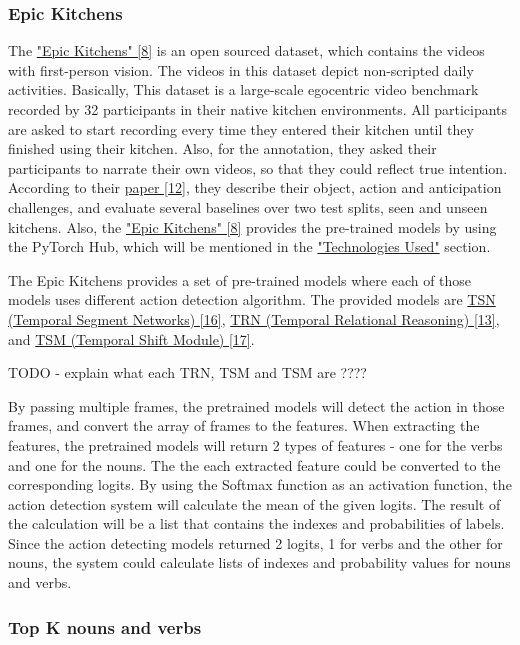\documentclass{article}
\begin{document}
\subsubsection{Epic Kitchens}

The \hyperlink{ref8}{"Epic Kitchens" [8]} is an open sourced dataset, which contains the videos with first-person vision. The videos in this dataset depict non-scripted daily activities. Basically, This dataset is  a large-scale egocentric video benchmark recorded by 32 participants in their native kitchen environments. All participants are asked to start recording every time they entered their kitchen until they finished using their kitchen. Also, for the annotation, they asked their participants to narrate their own videos, so that they could reflect true intention. According to their \hyperlink{ref12}{paper [12]}, they describe their object, action and anticipation challenges, and evaluate several baselines over two test splits, seen and unseen kitchens. Also, the \hyperlink{ref8}{"Epic Kitchens" [8]} provides the pre-trained models by using the PyTorch Hub, which will be mentioned in the \hyperlink{actionDetection_used}{"Technologies Used"} section.

The Epic Kitchens provides a set of pre-trained models where each of those models uses different action detection algorithm. The provided models are \hyperlink{ref16}{TSN (Temporal Segment Networks) [16]}, \hyperlink{ref13}{TRN (Temporal Relational Reasoning) [13]}, and \hyperlink{ref17}{TSM (Temporal Shift Module) [17]}.

TODO - explain what each TRN, TSM and TSM are ????

By passing multiple frames, the pretrained models will detect the action in those frames, and convert the array of frames to the features. When extracting the features, the pretrained models will return 2 types of features - one for the verbs and one for the nouns. The the each extracted feature could be converted to the corresponding logits. By using the Softmax function as an activation function, the action detection system will calculate the mean of the given logits. The result of the calculation will be a list that contains the indexes and probabilities of labels. Since the action detecting models returned 2 logits, 1 for verbs and the other for nouns, the system could calculate lists of indexes and probability values for nouns and verbs.

\subsubsection{Top K nouns and verbs}
\end{document}
